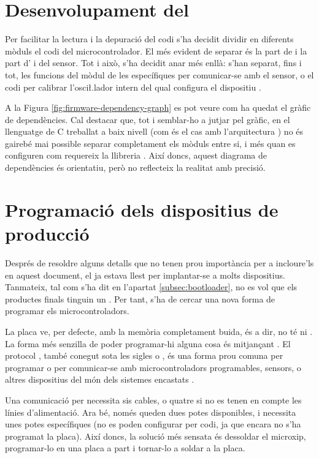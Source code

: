 \section{Desenvolupament del }

Per facilitar la lectura i la depuració del codi s'ha decidit dividir en
diferents mòduls el codi del microcontrolador. El més evident de separar és
la part de  i la part d' i del sensor. Tot i això, s'ha
decidit anar més enllà: s'han separat, fins i tot, les funcions del mòdul
 de les específiques per comunicar-se amb el sensor, o el codi per
calibrar l'osci\l.lador intern del qual configura el dispositiu . 

A la Figura \ref{fig:firmware-dependency-graph} es pot veure com ha quedat el gràfic
de dependències. Cal destacar que, tot i semblar-ho a jutjar pel gràfic, en el
llenguatge de C treballat a baix nivell (com és el cas amb l'arquitectura
) no és gairebé mai possible separar completament els mòduls entre
si, i més quan es configuren com requereix la llibreria . Així
doncs, aquest diagrama de dependències és orientatiu, però no reflecteix la
realitat amb precisió.



\section{Programació dels dispositius de producció}

Després de resoldre alguns detalls que no tenen prou importància per a
incloure'ls en aquest document, el  ja estava llest per 
implantar-se a molts dispositius. Tanmateix, tal com s'ha dit en
l'apartat \ref{subsec:bootloader}, no es vol que els productes finals tinguin
un . Per tant, s'ha de cercar una nova forma de programar
els microcontroladors.

La placa  ve, per defecte, amb la memòria  completament
buida, és a dir, no té ni . La forma més senzilla de poder
programar-hi alguna cosa és mitjançant . El protocol
, també conegut sota les sigles  o
, és una forma prou comuna per
programar o per comunicar-se amb microcontroladors programables, sensors, o altres
dispositius del món dels sistemes encastats \cite{Isp}.

Una comunicació per  necessita sis cables, o quatre si no es tenen en compte
les línies d'alimentació. Ara bé, només queden dues potes disponibles, i 
necessita unes potes específiques (no es poden configurar per codi, ja que
encara no s'ha programat la placa). Així doncs, la solució més sensata és
dessoldar el microxip, programar-lo en una placa a part i tornar-lo a soldar
a la placa.

